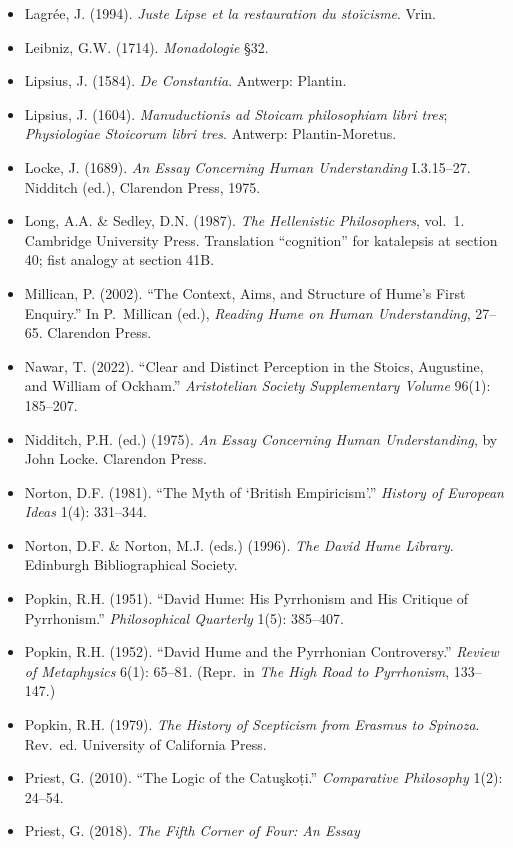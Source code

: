 \documentclass[11pt]{article}
\theoremstyle{plain}
\theoremstyle{definition}
\theoremstyle{remark}
\begin{document}
\begin{itemize}
SUNY Press.
\item Lagr\'ee, J. (1994). \emph{Juste Lipse et la restauration du
sto\"icisme}. Vrin.
\item Leibniz, G.W. (1714). \emph{Monadologie} \S32.
\item Lipsius, J. (1584). \emph{De Constantia}. Antwerp: Plantin.
\item Lipsius, J. (1604). \emph{Manuductionis ad Stoicam philosophiam
libri tres}; \emph{Physiologiae Stoicorum libri tres}. Antwerp:
Plantin-Moretus.
\item Locke, J. (1689). \emph{An Essay Concerning Human Understanding}
I.3.15--27. Nidditch (ed.), Clarendon Press, 1975.
\item Long, A.A. \& Sedley, D.N. (1987). \emph{The Hellenistic
Philosophers}, vol.~1. Cambridge University Press. Translation
``cognition'' for katalepsis at section 40; fist analogy at section
41B.
\item Millican, P. (2002). ``The Context, Aims, and Structure of Hume's
First Enquiry.'' In P.~Millican (ed.), \emph{Reading Hume on Human
Understanding}, 27--65. Clarendon Press.
\item Nawar, T. (2022). ``Clear and Distinct Perception in the Stoics,
Augustine, and William of Ockham.'' \emph{Aristotelian Society
Supplementary Volume} 96(1): 185--207.
\item Nidditch, P.H. (ed.) (1975). \emph{An Essay Concerning Human
Understanding}, by John Locke. Clarendon Press.
\item Norton, D.F. (1981). ``The Myth of `British Empiricism'.''
\emph{History of European Ideas} 1(4): 331--344.
\item Norton, D.F. \& Norton, M.J. (eds.) (1996). \emph{The David Hume
Library}. Edinburgh Bibliographical Society.
\item Popkin, R.H. (1951). ``David Hume: His Pyrrhonism and His
Critique of Pyrrhonism.'' \emph{Philosophical Quarterly} 1(5):
385--407.
\item Popkin, R.H. (1952). ``David Hume and the Pyrrhonian
Controversy.'' \emph{Review of Metaphysics} 6(1): 65--81. (Repr.\ in
\emph{The High Road to Pyrrhonism}, 133--147.)
\item Popkin, R.H. (1979). \emph{The History of Scepticism from Erasmus
to Spinoza}. Rev.\ ed. University of California Press.
\item Priest, G. (2010). ``The Logic of the Catu\c{s}ko\d{t}i.''
\emph{Comparative Philosophy} 1(2): 24--54.
\item Priest, G. (2018). \emph{The Fifth Corner of Four: An Essay
}
\end{itemize}
\end{document}
